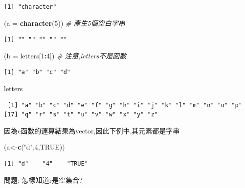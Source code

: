 \documentclass[]{book}
\newenvironment{Shaded}{\begin{snugshade}}{\end{snugshade}}
\newcommand{\CommentTok}[1]{\textcolor[rgb]{0.56,0.35,0.01}{\textit{#1}}}
\newcommand{\DataTypeTok}[1]{\textcolor[rgb]{0.13,0.29,0.53}{#1}}
\newcommand{\DecValTok}[1]{\textcolor[rgb]{0.00,0.00,0.81}{#1}}
\newcommand{\KeywordTok}[1]{\textcolor[rgb]{0.13,0.29,0.53}{\textbf{#1}}}
\newcommand{\NormalTok}[1]{#1}
\newcommand{\OperatorTok}[1]{\textcolor[rgb]{0.81,0.36,0.00}{\textbf{#1}}}
\newcommand{\OtherTok}[1]{\textcolor[rgb]{0.56,0.35,0.01}{#1}}
\newcommand{\StringTok}[1]{\textcolor[rgb]{0.31,0.60,0.02}{#1}}
\theoremstyle{definition}
\theoremstyle{definition}
\theoremstyle{definition}
\theoremstyle{remark}
\begin{document}
\begin{verbatim}
[1] "character"
\end{verbatim}

\begin{Shaded}
\begin{Highlighting}[]
\NormalTok{(}\DataTypeTok{a =} \KeywordTok{character}\NormalTok{(}\DecValTok{5}\NormalTok{)) }\CommentTok{# 產生5個空白字串}
\end{Highlighting}
\end{Shaded}

\begin{verbatim}
[1] "" "" "" "" ""
\end{verbatim}

\begin{Shaded}
\begin{Highlighting}[]
\NormalTok{(}\DataTypeTok{b =}\NormalTok{ letters[}\DecValTok{1}\OperatorTok{:}\DecValTok{4}\NormalTok{]) }\CommentTok{# 注意,letters不是函數}
\end{Highlighting}
\end{Shaded}

\begin{verbatim}
[1] "a" "b" "c" "d"
\end{verbatim}

\begin{Shaded}
\begin{Highlighting}[]
\NormalTok{letters}
\end{Highlighting}
\end{Shaded}

\begin{verbatim}
 [1] "a" "b" "c" "d" "e" "f" "g" "h" "i" "j" "k" "l" "m" "n" "o" "p"
[17] "q" "r" "s" "t" "u" "v" "w" "x" "y" "z"
\end{verbatim}

因為c函數的運算結果為vector,因此下例中,其元素都是字串

\begin{Shaded}
\begin{Highlighting}[]
\NormalTok{ (a<-}\KeywordTok{c}\NormalTok{(}\StringTok{"d"}\NormalTok{,}\DecValTok{4}\NormalTok{,}\OtherTok{TRUE}\NormalTok{))}
\end{Highlighting}
\end{Shaded}

\begin{verbatim}
[1] "d"    "4"    "TRUE"
\end{verbatim}

問題: 怎樣知道r是空集合?
\end{document}
